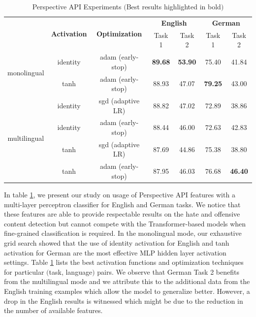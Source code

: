\documentclass[
]{ceurart}
\begin{document}
\begin{table}[]
\centering
\begin{tabular*}{\textwidth}{c@{\extracolsep{\fill}} cccccc}
\toprule
 & \multirow{2}{*}{\textbf{Activation}} & \multirow{2}{*}{\textbf{Optimization}} & \multicolumn{2}{c}{\textbf{English}} & \multicolumn{2}{c}{\textbf{German}} \\ \cmidrule{4-5} \cmidrule{6-7}
 & & & Task 1 & Task 2 & Task 1 & Task 2 \\ \midrule
\multirow{2}{*}{monolingual}  & identity & adam (early-stop) & \textbf{89.68} & \textbf{53.90} & 75.40 & 41.84 \\ 
& tanh & adam (early-stop) & 88.93 & 47.07 & \textbf{79.25} & 43.00 \\ \midrule
\multirow{4}{*}{multilingual} & identity & sgd (adaptive LR) & 88.82 & 47.02 & 72.89 & 38.86 \\
& identity & adam (early-stop) & 88.44 & 46.00 & 72.63 & 42.83 \\
& tanh & sgd (adaptive LR) & 87.69 & 44.86 & 75.38 & 38.80 \\
& tanh & adam (early-stop) & 87.95 & 46.03 & 76.68 & \textbf{46.40} \\ %
 
\end{tabular*}
\caption{Perspective API Experiments $($Best results highlighted in bold$)$}
\label{tab:perspective}
\end{table}

In table \ref{tab:perspective}, we present our study on usage of Perspective API features with a multi-layer perceptron classifier for English and German tasks. We notice that these features are able to provide respectable results on the hate and offensive content detection but cannot compete with the Transformer-based models when fine-grained classification is required. In the monolingual mode, our exhaustive grid search showed that the use of identity activation for English and tanh activation for German are the most effective MLP hidden layer activation settings. Table \ref{tab:perspective} lists the best activation functions and optimization techniques for particular $($task, language$)$ pairs. We observe that German Task 2 benefits from the multilingual mode and we attribute this to the additional data from the English training examples which allow the model to generalize better. However, a drop in the English results is witnessed which might be due to the reduction in the number of available features.
\end{document}
